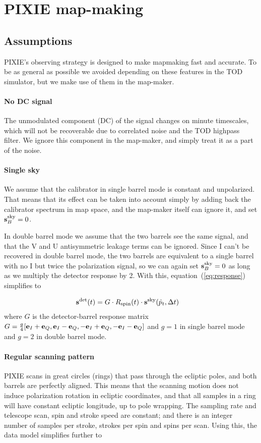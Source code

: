 \documentclass{article}
\renewcommand{\vec}[1]{{\bf #1}}
\begin{document}
\section{PIXIE map-making}
\subsection{Assumptions}
PIXIE's observing strategy is designed to make mapmaking
fast and accurate. To be as general as possible we avoided depending
on these features in the TOD simulator, but we make use of them
in the map-maker.

\paragraph{No DC signal}
The unmodulated component (DC) of the signal changes on minute timescales,
which will not be recoverable due to correlated noise and the TOD highpass
filter. We ignore this component in the map-maker, and simply treat it as
a part of the noise.

\paragraph{Single sky}
We assume that the calibrator in single barrel mode is constant and
unpolarized. That means that its effect can be taken into account
simply by adding back the calibrator spectrum in map space, and
the map-maker itself can ignore it, and set $\vec s^\textrm{sky}_B=0$.

In double barrel mode we assume that the two barrels see the same signal,
and that the V and U antisymmetric leakage terms can be ignored.
Since I can't be recovered in double barrel mode, the two barrels are
equivalent to a single barrel with no I but twice the polarization signal,
so we can again set $\vec s^\textrm{sky}_B=0$ as long as we multiply the
detector response by 2. With this, equation~(\ref{eq:response}) simplifies
to

\begin{align}
	\vec s^\textrm{det}(t) &=
		G \cdot R_\textrm{spin}(t)\cdot\vec s^\textrm{sky}(\hat p_t,\Delta t)
\end{align}
where $G$ is the detector-barrel response matrix
$G = \frac{g}{4}[\vec e_I+\vec e_Q,\vec e_I-\vec e_Q,-\vec e_I+\vec e_Q,
-\vec e_I-\vec e_Q]$ and $g = 1$ in single barrel mode and $g = 2$ in
double barrel mode.

\paragraph{Regular scanning pattern}
PIXIE scans in great circles (rings) that pass through the ecliptic poles,
and both barrels are perfectly aligned. This means that the scanning motion
does not induce polarization rotation in ecliptic coordinates, and that all
samples in a ring will have constant ecliptic longitude, up to pole wrapping.
The sampling rate and telescope scan, spin and stroke speed are constant;
and there is an integer number of samples per stroke, strokes per spin and spins
per scan. Using this, the data model simplifies further to
\end{document}
